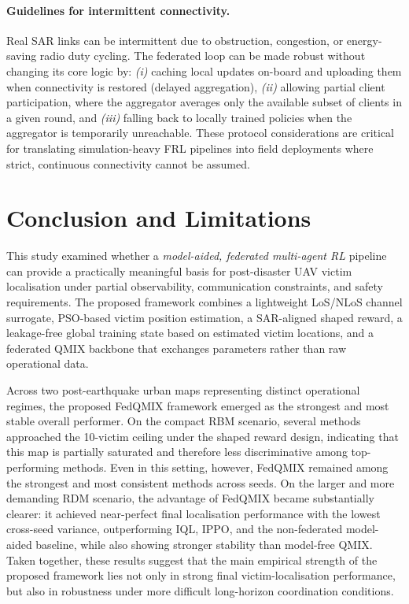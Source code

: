 \documentclass[drones,article,accept,pdftex,moreauthors]{Definitions/mdpi}
\begin{document}
\paragraph{Guidelines for intermittent connectivity.}
Real SAR links can be intermittent due to obstruction, congestion, or energy-saving
radio duty cycling. The federated loop can be made robust without changing its core
logic by:
\emph{(i)} caching local updates on-board and uploading them when connectivity is
restored (delayed aggregation),
\emph{(ii)} allowing partial client participation, where the aggregator averages only
the available subset of clients in a given round, and
\emph{(iii)} falling back to locally trained policies when the aggregator is
temporarily unreachable. These protocol considerations are critical for translating
simulation-heavy FRL pipelines into field deployments where strict, continuous
connectivity cannot be assumed.







\section{Conclusion and Limitations}
\label{sec13}

This study examined whether a \emph{model-aided, federated multi-agent RL}
pipeline can provide a practically meaningful basis for post-disaster UAV victim
localisation under partial observability, communication constraints, and safety
requirements. The proposed framework combines a lightweight LoS/NLoS channel
surrogate, PSO-based victim position estimation, a SAR-aligned shaped reward,
a leakage-free global training state based on estimated victim locations, and a
federated QMIX backbone that exchanges parameters rather than raw operational data.

Across two post-earthquake urban maps representing distinct operational regimes,
the proposed FedQMIX framework emerged as the strongest and most stable overall
performer. On the compact RBM scenario, several methods approached the
10-victim ceiling under the shaped reward design, indicating that this map is
partially saturated and therefore less discriminative among top-performing
methods. Even in this setting, however, FedQMIX remained among the strongest and
most consistent methods across seeds. On the larger and more demanding RDM
scenario, the advantage of FedQMIX became substantially clearer: it achieved
near-perfect final localisation performance with the lowest cross-seed variance,
outperforming IQL, IPPO, and the non-federated model-aided baseline, while also
showing stronger stability than model-free QMIX. Taken together, these results
suggest that the main empirical strength of the proposed framework lies not only
in strong final victim-localisation performance, but also in robustness under
more difficult long-horizon coordination conditions.
\end{document}
